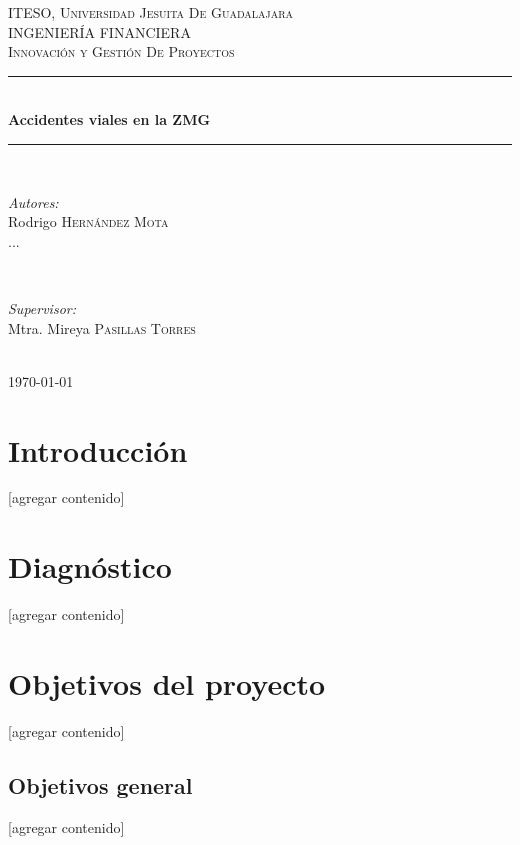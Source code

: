 \documentclass{article}
\begin{document}
\begin{titlepage}
\newcommand{\HRule}{\rule{\linewidth}{0.5mm}}

\center
\textsc{\LARGE ITESO, Universidad Jesuita De Guadalajara}\\[2cm]
\textsc{\Large INGENIERÍA FINANCIERA}\\[1cm]
\textsc{\large Innovación y Gestión De Proyectos}\\[1cm]
\HRule \\[2cm]
{ \huge \bfseries Accidentes viales en la ZMG}\\[2cm] 
\HRule \\[2cm]
\begin{minipage}{0.4\textwidth}
\begin{flushleft} \large


\emph{Autores:}\\
Rodrigo \textsc{Hernández Mota}\\
...
\end{flushleft}
\end{minipage}
~
\begin{minipage}{0.4\textwidth}
\begin{flushright} \large
\emph{Supervisor:} \\
Mtra. Mireya \textsc{Pasillas Torres}
\end{flushright}
\end{minipage}\\[2cm]

{\large \today}\\[1cm]

\vfill
 
\end{titlepage}
\tableofcontents
\newpage

\section{Introducción}\label{sec:into}
[agregar contenido]

\section{Diagnóstico}\label{sec:diagnostic}
[agregar contenido]

\section{Objetivos del proyecto}\label{sec:objs}
[agregar contenido]

\subsection{Objetivos general}\label{subsec:general-objs}
[agregar contenido]
\end{document}
